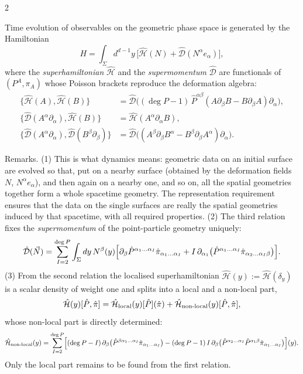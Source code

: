 \begin{paracol}{2}
\begin{definition}\label{def:c29-dynamics}
Time evolution of observables on the geometric phase space is generated by the Hamiltonian
\[
  H=\int_\Sigma d^{d-1}y\,\bigl[\hat{\mathcal H}(N)+\hat{\mathcal D}(N^\alpha e_\alpha)\bigr],
\]
where the \emph{superhamiltonian} $\hat{\mathcal H}$ and the \emph{supermomentum} $\hat{\mathcal D}$ are functionals of $(P^A,\pi_A)$ whose Poisson brackets reproduce the deformation algebra:
\begin{align*}
  \{\hat{\mathcal H}(A),\hat{\mathcal H}(B)\}&=\hat{\mathcal D}\bigl((\deg P-1)\,\hat P^{\alpha\beta}(A\partial_\beta B-B\partial_\beta A)\partial_\alpha\bigr),\\
  \{\hat{\mathcal D}(A^\alpha\partial_\alpha),\hat{\mathcal H}(B)\}&=\hat{\mathcal H}(A^\alpha\partial_\alpha B),\\
  \{\hat{\mathcal D}(A^\alpha\partial_\alpha),\hat{\mathcal D}(B^\beta\partial_\beta)\}&=\hat{\mathcal D}\bigl((A^\beta\partial_\beta B^\alpha-B^\beta\partial_\beta A^\alpha)\partial_\alpha\bigr).
\end{align*}
\end{definition}

Remarks. (1) This is what dynamics means: geometric data on an initial surface are evolved so that, put on a nearby surface (obtained by the deformation fields $N$, $N^\alpha e_\alpha$), and then again on a nearby one, and so on, all the spatial geometries together form a whole spacetime geometry. The representation requirement ensures that the data on the single surfaces are really the spatial geometries induced by that spacetime, with all required properties. (2) The third relation fixes the \emph{supermomentum} of the point-particle geometry uniquely:
\[
  \hat{\mathcal D}(\vec N)=\sum_{I=2}^{\deg P}\int_\Sigma dy\,N^\beta(y)\Bigl[\partial_\beta\hat P^{\alpha_1\dots\alpha_I}\hat\pi_{\alpha_1\dots\alpha_I}+I\,\partial_{\alpha_1}\bigl(\hat P^{\alpha_1\dots\alpha_I}\hat\pi_{\alpha_2\dots\alpha_I\beta}\bigr)\Bigr].
\]
(3) From the second relation the localised superhamiltonian $\hat{\mathcal H}(y):=\hat{\mathcal H}(\delta_y)$ is a scalar density of weight one and splits into a local and a non-local part,
\[
  \hat{\mathcal H}(y)[\hat P,\hat\pi]=\hat{\mathcal H}_{\rm local}(y)[\hat P](\hat\pi)+\hat{\mathcal H}_{\rm non\text{-}local}(y)[\hat P,\hat\pi],
\]
whose non-local part is directly determined:
\[
  \hat{\mathcal H}_{\rm non\text{-}local}(y)=\sum_{I=2}^{\deg P}\Bigl[(\deg P-I)\,\partial_\beta\bigl(\hat P^{\beta\alpha_1\dots\alpha_I}\hat\pi_{\alpha_1\dots\alpha_I}\bigr)-(\deg P-1)\,I\,\partial_\beta\bigl(\hat P^{\alpha_2\dots\alpha_I}\hat P^{\alpha_1\beta}\hat\pi_{\alpha_1\dots\alpha_I}\bigr)\Bigr](y).
\]
Only the local part remains to be found from the first relation.


\end{paracol}

